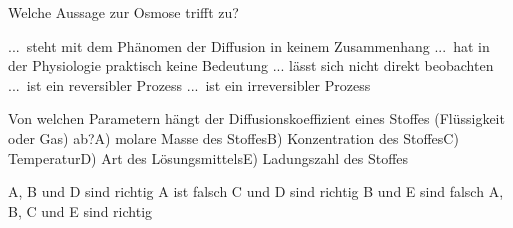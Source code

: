\documentclass[11pt]{exam}
\begin{document}
\begin{questions}
\vspace{3mm}\question Welche Aussage zur Osmose trifft zu?

\begin{choices}
	\choice ... steht mit dem Phänomen der Diffusion in keinem Zusammenhang
	\choice ... hat in der Physiologie praktisch keine Bedeutung
	\choice ... lässt sich nicht direkt beobachten
	\choice ... ist ein reversibler Prozess
	\choice ... ist ein irreversibler Prozess
\end{choices}

\vspace{3mm}\question Von welchen Parametern hängt der Diffusionskoeffizient eines Stoffes (Flüssigkeit oder Gas) ab?A) molare Masse des StoffesB) Konzentration des StoffesC) TemperaturD) Art des LösungsmittelsE) Ladungszahl des Stoffes

\begin{choices}
	\choice A, B und D sind richtig
	\choice A ist falsch
	\choice C und D sind richtig
	\choice B und E sind falsch
	\choice A, B, C und E sind richtig
\end{choices}

\vspace{3mm}\end{questions}
\end{document}
